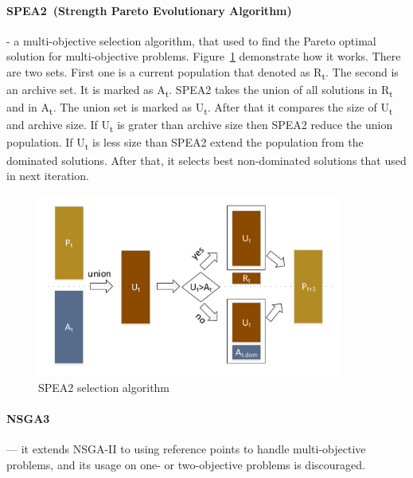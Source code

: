 \paragraph{SPEA2~(Strength Pareto Evolutionary Algorithm)~\cite{zitzler01}} - a multi-objective selection algorithm, that used to find the Pareto optimal solution for multi-objective problems\cite{zhihuan2010}. Figure~\ref{fig:spea2} demonstrate how it works.
There are two sets. First one is a current population that denoted as \texorpdfstring{R\textsubscript{t}}{R t}. The second is an archive set. It is marked as \texorpdfstring{A\textsubscript{t}}{A t}. SPEA2 takes the union of all solutions in \texorpdfstring{R\textsubscript{t}}{R t} and in \texorpdfstring{A\textsubscript{t}}{A t}. The union set is marked as \texorpdfstring{U\textsubscript{t}}{U t}. After that it compares the size of \texorpdfstring{U\textsubscript{t}}{U t} and archive size. If \texorpdfstring{U\textsubscript{t}}{U t} is grater than archive size then SPEA2 reduce the union population. If \texorpdfstring{U\textsubscript{t}}{U t} is less  size than SPEA2 extend the population from the dominated solutions. After that, it selects best non-dominated solutions that used in next iteration.

\begin{figure}
	\centering
	\includegraphics[width=0.9\textwidth]{images/spea2Selector.pdf}
	\caption[SPEA2 selection algorithm]{SPEA2 selection algorithm}
	\label{fig:spea2}
\end{figure}

\paragraph{NSGA3~\cite{deb14}} — it extends NSGA-II to using reference points to handle multi-objective problems, and its usage on one- or two-objective problems is discouraged.
